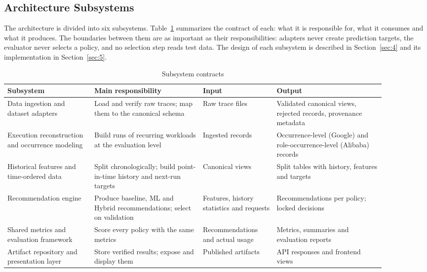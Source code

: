\documentclass{IEEEtran}
\begin{document}
\subsection{Architecture Subsystems}\label{sec:2.2}

The architecture is divided into six subsystems. Table~\ref{tab:2.1} summarizes the contract of each: what it is responsible for, what it consumes and what it produces. The boundaries between them are as important as their responsibilities: adapters never create prediction targets, the evaluator never selects a policy, and no selection step reads test data. The design of each subsystem is described in Section~\ref{sec:4} and its implementation in Section~\ref{sec:5}.

\begin{table}[!t]
\centering
\footnotesize
\caption{Subsystem contracts}\label{tab:2.1}
\begin{tabular}{>{\raggedright\arraybackslash}p{0.203\linewidth}>{\raggedright\arraybackslash}p{0.258\linewidth}>{\raggedright\arraybackslash}p{0.170\linewidth}>{\raggedright\arraybackslash}p{0.258\linewidth}}
\hline
\textbf{Subsystem} & \textbf{Main responsibility} & \textbf{Input} & \textbf{Output} \\ \hline
Data ingestion and dataset adapters & Load and verify raw traces; map them to the canonical schema & Raw trace files & Validated canonical views, rejected records, provenance metadata \\
Execution reconstruction and occurrence modeling & Build runs of recurring workloads at the evaluation level & Ingested records & Occurrence-level (Google) and role-occurrence-level (Alibaba) records \\
Historical features and time-ordered data & Split chronologically; build point-in-time history and next-run targets & Canonical views & Split tables with history, features and targets \\
Recommendation engine & Produce baseline, ML and Hybrid recommendations; select on validation & Features, history statistics and requests & Recommendations per policy; locked decisions \\
Shared metrics and evaluation framework & Score every policy with the same metrics & Recommendations and actual usage & Metrics, summaries and evaluation reports \\
Artifact repository and presentation layer & Store verified results; expose and display them & Published artifacts & API responses and frontend views \\
\hline
\end{tabular}
\end{table}
\end{document}
